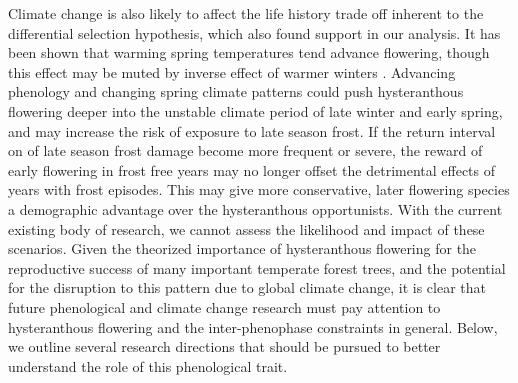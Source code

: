 \documentclass{article}\usepackage[]{graphicx}\usepackage[]{color}
\begin{document}
\indent Climate change is also likely to affect the life history trade off inherent to the differential selection hypothesis, which also found support in our analysis. It has been shown that warming spring temperatures tend advance flowering, though this effect may be muted by inverse effect of warmer winters \citep{Cook2012}. Advancing phenology and changing spring climate patterns could push hysteranthous flowering deeper into the unstable climate period of late winter and early spring, and may increase the risk of exposure to late season frost. If the return interval on of late season frost damage become more frequent or severe, the reward of early flowering in frost free years may no longer offset the detrimental effects of years with frost episodes. This may give more conservative, later flowering species a demographic advantage over the hysteranthous opportunists. With the current existing body of research, we cannot assess the likelihood and impact of these scenarios. Given the theorized importance of hysteranthous flowering for the reproductive success of many important temperate forest trees, and the potential for the disruption to this pattern due to global climate change, it is clear that future phenological and climate change research must pay attention to hysteranthous flowering and the inter-phenophase constraints in general. Below, we outline several research directions that should be pursued to better understand the role of this phenological trait.
\end{document}
